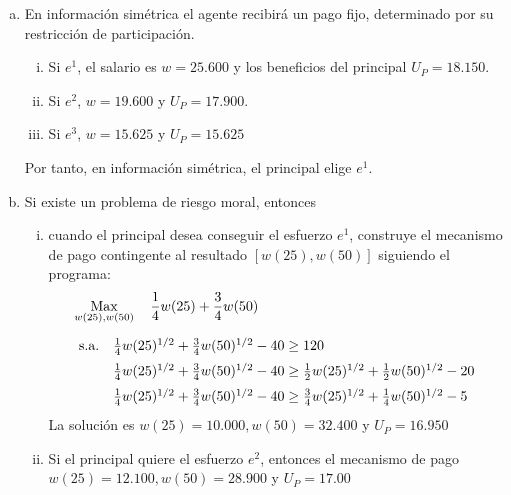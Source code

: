 \begin{enumerate}[a)]
	\item En información simétrica el agente recibirá un pago fijo, determinado por su restricción de participación.
			\begin{enumerate}[i)]
				\item Si $e^1$, el salario es $w=25.600$ y los beneficios del principal $U_P = 18.150$.
				\item Si $e^2$, $w=19.600$ y $U_P=17.900$.
				\item Si $e^3$, $w=15.625$ y $U_P=15.625$
			\end{enumerate}
		Por tanto, en información simétrica, el principal elige $e^1$.
	\item Si existe un problema de riesgo moral, entonces
			\begin{enumerate}[i)]
				\item cuando el principal desea conseguir el esfuerzo $e^1$, construye el mecanismo de pago contingente al resultado $\left[ w(25), w(50)\right]$ siguiendo el programa:
					\begin{align*}
						& \operatorname*{Max} \limits_{w(25), w(50)} \quad \frac{1}{4} w(25)+\frac{3}{4} w(50)\\[0.2cm]
						& \begin{array}{ll}
							\text{s.a.}  & \frac{1}{4} w(25)^{1 / 2}+\frac{3}{4} w(50)^{1 / 2}-40 \geq 120 \\[0.2cm]
										 & \frac{1}{4} w(25)^{1 / 2}+\frac{3}{4} w(50)^{1 / 2}-40 \geq \frac{1}{2} w(25)^{1 / 2}+\frac{1}{2} w(50)^{1 / 2}-20 \\[0.2cm]
										 & \frac{1}{4} w(25)^{1 / 2}+\frac{3}{4} w(50)^{1 / 2}-40 \geq \frac{3}{4} w(25)^{1 / 2}+\frac{1}{4} w(50)^{1 / 2}-5
						  \end{array}
					\end{align*}
				La solución es $w(25)=10.000, w(50)=32.400$ y $U_P=16.950$
				
				\item Si el principal quiere el esfuerzo $e^2$, entonces el mecanismo de pago $w(25)=12.100, w(50)=28.900$ y $U_P=17.00$\\
				

\end{enumerate}
\end{enumerate}
